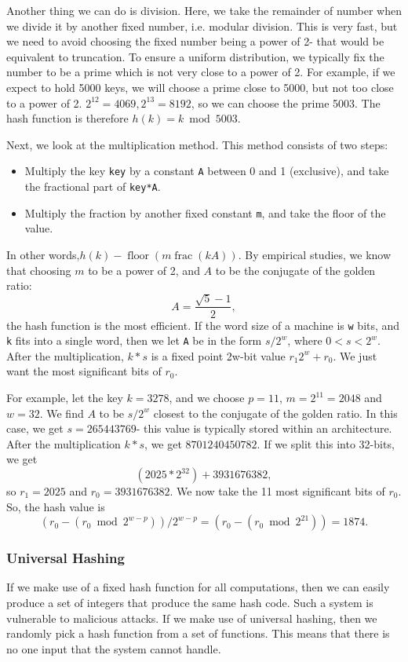 \documentclass[a4paper, openany]{memoir}
\begin{document}
\noindent Another thing we can do is division. Here, we take the remainder of number when we divide it by another fixed number, i.e. modular division. This is very fast, but we need to avoid choosing the fixed number being a power of 2- that would be equivalent to truncation. To ensure a uniform distribution, we typically fix the number to be a prime which is not very close to a power of 2. For example, if we expect to hold 5000 keys, we will choose a prime close to 5000, but not too close to a power of 2. $2^{12} = 4069, 2^{13} = 8192$, so we can choose the prime 5003. The hash function is therefore $h(k) = k \bmod{5003}$.

\noindent Next, we look at the multiplication method. This method consists of two steps:
\begin{itemize}
    \item Multiply the key \texttt{key} by a constant \texttt{A} between 0 and 1 (exclusive), and take the fractional part of \texttt{key*A}.
    \item Multiply the fraction by another fixed constant \texttt{m}, and take the floor of the value.
\end{itemize}
In other words,$h(k) - \operatorname{floor}(m \operatorname{frac}(kA))$. By empirical studies, we know that choosing $m$ to be a power of 2, and $A$ to be the conjugate of the golden ratio:
\[A = \frac{\sqrt{5} - 1}{2},\]
the hash function is the most efficient. If the word size of a machine is \texttt{w} bits, and \texttt{k} fits into a single word, then we let \texttt{A} be in the form $s/2^w$, where $0 < s < 2^w$. After the multiplication, $k * s$ is a fixed point 2w-bit value $r_1 2^w + r_0$. We just want the most significant bits of $r_0$.

\noindent For example, let the key $k = 3278$, and we choose $p = 11$, $m = 2^{11} = 2048$ and $w = 32$. We find $A$ to be $s/2^w$ closest to the conjugate of the golden ratio. In this case, we get $s = 265443769$- this value is typically stored within an architecture. After the multiplication $k * s$, we get $8 701 240 450 782$. If we split this into 32-bits, we get
\[(2025 * 2^{32}) + 3 931 676 382,\]
so $r_1 = 2025$ and $r_0 = 3 931 676 382$. We now take the 11 most significant bits of $r_0$. So, the hash value is
\[(r_0 - (r_0 \bmod{2^{w-p}}))/2^{w-p} = (r_0 - (r_0 \bmod{2^{21}})) = 1874.\]

\subsubsection{Universal Hashing}
If we make use of a fixed hash function for all computations, then we can easily produce a set of integers that produce the same hash code. Such a system is vulnerable to malicious attacks. If we make use of universal hashing, then we randomly pick a hash function from a set of functions. This means that there is no one input that the system cannot handle. 
\end{document}
